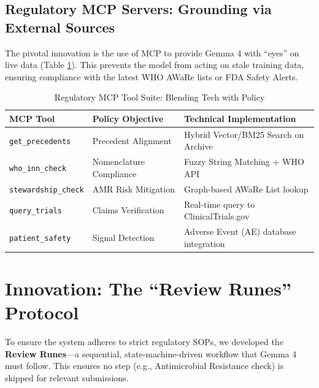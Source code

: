 \documentclass[11pt,a4paper]{article}
\begin{document}
\subsection{Regulatory MCP Servers: Grounding via External Sources}
The pivotal innovation is the use of MCP to provide Gemma 4 with ``eyes'' on live data (Table \ref{tab:mcp_tools}). This prevents the model from acting on stale training data, ensuring compliance with the latest WHO AWaRe lists or FDA Safety Alerts.

\begin{table}[h]
\centering
\caption{Regulatory MCP Tool Suite: Blending Tech with Policy}
\label{tab:mcp_tools}
\begin{tabular}{@{}lll@{}}
\toprule
\textbf{MCP Tool} & \textbf{Policy Objective} & \textbf{Technical Implementation} \\ \midrule
\texttt{get_precedents} & Precedent Alignment & Hybrid Vector/BM25 Search on Archive \\
\texttt{who_inn_check} & Nomenclature Compliance & Fuzzy String Matching + WHO API \\
\texttt{stewardship_check} & AMR Risk Mitigation & Graph-based AWaRe List lookup \\
\texttt{query_trials} & Claims Verification & Real-time query to ClinicalTrials.gov \\
\texttt{patient_safety} & Signal Detection & Adverse Event (AE) database integration \\ \bottomrule
\end{tabular}
\end{table}

\section{Innovation: The ``Review Runes'' Protocol}
To ensure the system adheres to strict regulatory SOPs, we developed the \textbf{Review Runes}---a sequential, state-machine-driven workflow that Gemma 4 must follow. This ensures no step (e.g., Antimicrobial Resistance check) is skipped for relevant submissions.
\end{document}

